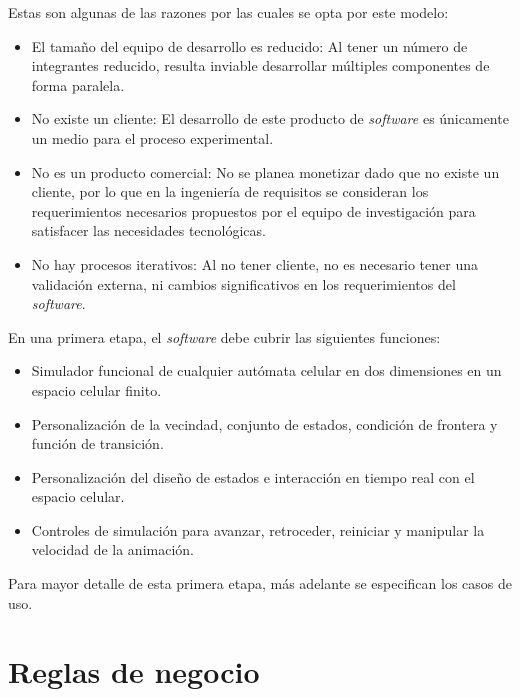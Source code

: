 Estas son algunas de las razones por las cuales se opta por este modelo:

\begin{itemize}
	\item El tamaño del equipo de desarrollo es reducido: Al tener un número de integrantes reducido, resulta inviable desarrollar múltiples componentes de forma paralela. 
	
	\item No existe un cliente: El desarrollo de este producto de \textit{software} es únicamente un medio para el proceso experimental.
	
	\item No es un producto comercial: No se planea monetizar dado que no existe un cliente, por lo que en la ingeniería de requisitos se consideran los requerimientos necesarios propuestos por el equipo de investigación para satisfacer las necesidades tecnológicas.
	
	\item No hay procesos iterativos: Al no tener cliente, no es necesario tener una validación externa, ni cambios significativos en los requerimientos del \textit{software}. 
\end{itemize}

En una primera etapa, el \textit{software} debe cubrir las siguientes funciones:

\begin{itemize}
	\item Simulador funcional de cualquier autómata celular en dos dimensiones en un espacio celular finito.
	
	\item Personalización de la vecindad, conjunto de estados, condición de frontera y función de transición.
	
	\item Personalización del diseño de estados e interacción en tiempo real con el espacio celular.
	
	\item Controles de simulación para avanzar, retroceder, reiniciar y manipular la velocidad de la animación.
\end{itemize}

Para mayor detalle de esta primera etapa, más adelante se especifican los casos de uso.

\section{Reglas de negocio}

